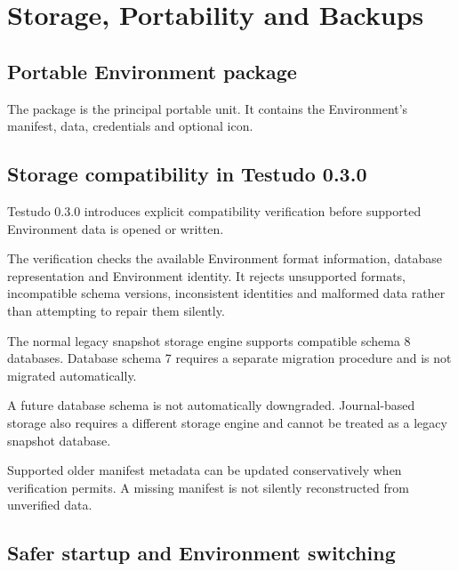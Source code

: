 \documentclass{testudomanual}
\begin{document}
\chapter{Storage, Portability and Backups}

\section{Portable Environment package}

The  package is the principal portable unit. It contains the Environment's manifest, data, credentials and optional icon.


\section{Storage compatibility in Testudo 0.3.0}

Testudo 0.3.0 introduces explicit compatibility verification before supported Environment data is opened or written.

The verification checks the available Environment format information, database representation and Environment identity. It rejects unsupported formats, incompatible schema versions, inconsistent identities and malformed data rather than attempting to repair them silently.

The normal legacy snapshot storage engine supports compatible schema 8 databases. Database schema 7 requires a separate migration procedure and is not migrated automatically.

A future database schema is not automatically downgraded. Journal-based storage also requires a different storage engine and cannot be treated as a legacy snapshot database.

Supported older manifest metadata can be updated conservatively when verification permits. A missing manifest is not silently reconstructed from unverified data.


\section{Safer startup and Environment switching}
\end{document}
